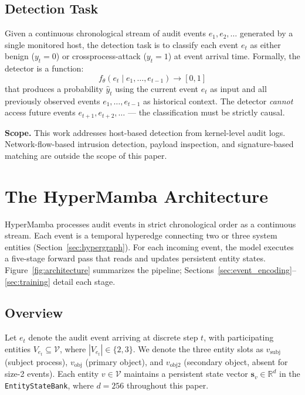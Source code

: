 \documentclass[letterpaper,twocolumn,10pt]{article}
\begin{document}
\subsection{Detection Task}
\label{sec:detection_task}

Given a continuous chronological stream of audit events $e_1, e_2, \dots$ generated by a single monitored host, the detection task is to classify each event $e_t$ as either benign ($y_t = 0$) or crossprocess-attack ($y_t = 1$) at event arrival time. Formally, the detector is a function:
\begin{equation}
    f_\theta(e_t \mid e_1, \dots, e_{t-1}) \to [0, 1]
\end{equation}
that produces a probability $\hat{y}_t$ using the current event $e_t$ as input and all previously observed events $e_1, \dots, e_{t-1}$ as historical context. The detector \emph{cannot} access future events $e_{t+1}, e_{t+2}, \dots$ --- the classification must be strictly causal.

\textbf{Scope.} This work addresses host-based detection from kernel-level audit logs. Network-flow-based intrusion detection, payload inspection, and signature-based matching are outside the scope of this paper.

\section{The HyperMamba Architecture}
\label{sec:architecture}

HyperMamba processes audit events in strict chronological order as a continuous stream. Each event is a temporal hyperedge connecting two or three system entities (Section~\ref{sec:hypergraph}). For each incoming event, the model executes a five-stage forward pass that reads and updates persistent entity states. Figure~\ref{fig:architecture} summarizes the pipeline; Sections~\ref{sec:event_encoding}--\ref{sec:training} detail each stage.



\subsection{Overview}
\label{sec:overview}

Let $e_t$ denote the audit event arriving at discrete step $t$, with participating entities $V_{e_t} \subseteq \mathcal{V}$, where $|V_{e_t}| \in \{2, 3\}$. We denote the three entity slots as $v_{\text{subj}}$ (subject process), $v_{\text{obj}}$ (primary object), and $v_{\text{obj2}}$ (secondary object, absent for size-2 events). Each entity $v \in \mathcal{V}$ maintains a persistent state vector $\mathbf{s}_v \in \mathbb{R}^d$ in the \texttt{EntityStateBank}, where $d = 256$ throughout this paper.
\end{document}
